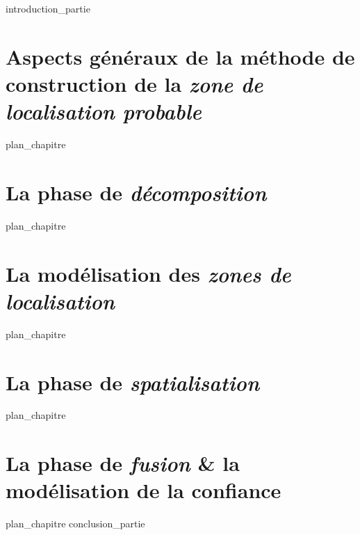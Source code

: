 \label{part:02_int}
{introduction_partie}
%
\chapter{Aspects généraux de la méthode de construction de la
  \emph{zone de localisation probable} }
\label{chap:04}
{plan_chapitre}
%
\chapter{La phase de \emph{décomposition} }
\label{chap:05}
{plan_chapitre}
%
\chapter{La modélisation des \emph{zones de localisation}}
\label{chap:06}
{plan_chapitre}
%
\chapter{La phase de \emph{spatialisation} }
\label{chap:07}
{plan_chapitre}
%
\chapter{La phase de \emph{fusion} \& la modélisation de la confiance
  }
\label{chap:08}
{plan_chapitre}
%
\label{part:02_cnc}
{conclusion_partie}
